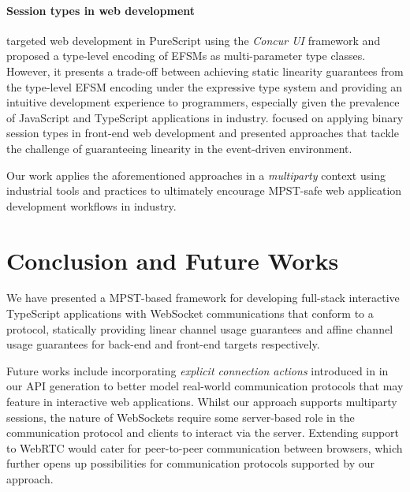 \documentclass[submission,copyright,creativecommons]{eptcs}
\begin{document}
\paragraph{Session types in web development} \cite{PureScript2019} targeted web development in PureScript using the \textit{Concur UI} framework and proposed a type-level encoding of EFSMs as multi-parameter type classes. However, it presents a trade-off between achieving static linearity guarantees from the type-level EFSM encoding under the expressive type system and providing an intuitive development experience to programmers, especially given the prevalence of JavaScript and TypeScript applications in industry. \cite{MVU2019} focused on applying binary session types in front-end web development and presented approaches that tackle the challenge of guaranteeing linearity in the event-driven environment. 

Our work applies the aforementioned approaches in a \textit{multiparty} context using industrial tools and practices to ultimately encourage MPST-safe web application development workflows in industry.


\section{Conclusion and Future Works}
We have presented a MPST-based framework for developing full-stack interactive TypeScript applications with WebSocket communications that conform to a protocol, statically providing linear channel usage guarantees and affine channel usage guarantees for back-end and front-end targets respectively.

Future works include incorporating \textit{explicit connection actions} introduced in \cite{ExplicitConnections} in our API generation to better model real-world communication protocols that may feature in interactive web applications. 
Whilst our approach supports multiparty sessions, the nature of WebSockets require some server-based role in the communication protocol and clients to interact via the server. Extending support to WebRTC would cater for peer-to-peer communication between browsers, which further opens up possibilities for communication protocols supported by our approach.


\nocite{*}


\end{document}
